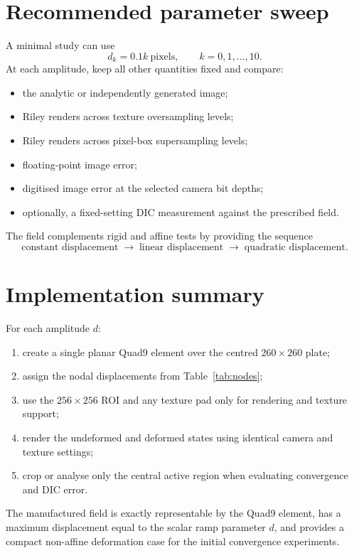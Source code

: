 \documentclass[11pt,a4paper]{article}
\begin{document}
\section{Recommended parameter sweep}

A minimal study can use
\begin{equation}
  d_k=0.1k\ \text{pixels},
  \qquad k=0,1,\ldots,10.
\end{equation}
At each amplitude, keep all other quantities fixed and compare:
\begin{itemize}
  \item the analytic or independently generated image;
  \item Riley renders across texture oversampling levels;
  \item Riley renders across pixel-box supersampling levels;
  \item floating-point image error;
  \item digitised image error at the selected camera bit depths;
  \item optionally, a fixed-setting DIC measurement against the prescribed field.
\end{itemize}
The field complements rigid and affine tests by providing the sequence
\begin{equation}
  \text{constant displacement}
  \;\longrightarrow\;
  \text{linear displacement}
  \;\longrightarrow\;
  \text{quadratic displacement}.
\end{equation}

\section{Implementation summary}

For each amplitude $d$:
\begin{enumerate}
  \item create a single planar Quad9 element over the centred $260\times260$ plate;
  \item assign the nodal displacements from Table~\ref{tab:nodes};
  \item use the $256\times256$ ROI and any texture pad only for rendering and texture support;
  \item render the undeformed and deformed states using identical camera and texture settings;
  \item crop or analyse only the central active region when evaluating convergence and DIC error.
\end{enumerate}

The manufactured field is exactly representable by the Quad9 element, has a maximum displacement equal to the scalar ramp parameter $d$, and provides a compact non-affine deformation case for the initial convergence experiments.
\end{document}

